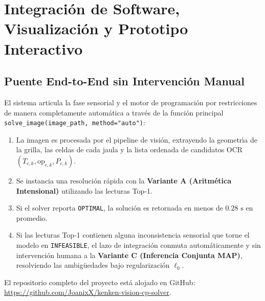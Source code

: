 
\section{Integraci\'on de Software, Visualizaci\'on y Prototipo Interactivo}
\label{sec:integration}

\subsection{Puente End-to-End sin Intervenci\'on Manual}
El sistema articula la fase sensorial y el motor de programaci\'on por restricciones de manera completamente autom\'atica a trav\'es de la funci\'on principal \texttt{solve\_image(image\_path, method="auto")}:

\begin{enumerate}
    \item La imagen es procesada por el pipeline de visi\'on, extrayendo la geometr\'{\i}a de la grilla, las celdas de cada jaula y la lista ordenada de candidatos OCR $(T_{c,k}, \text{op}_{c,k}, P_{c,k})$.
    \item Se instancia una resoluci\'on r\'apida con la \textbf{Variante A (Aritm\'etica Intensional)} utilizando las lecturas Top-1.
    \item Si el solver reporta \texttt{OPTIMAL}, la soluci\'on es retornada en menos de $0.28\text{ s}$ en promedio.
    \item Si las lecturas Top-1 contienen alguna inconsistencia sensorial que torne el modelo en \texttt{INFEASIBLE}, el lazo de integraci\'on conmuta autom\'aticamente y sin intervenci\'on humana a la \textbf{Variante C (Inferencia Conjunta MAP)}, resolviendo las ambig\"uedades bajo regularizaci\'on $\ell_0$.
\end{enumerate}

El repositorio completo del proyecto est\'a alojado en GitHub: \url{https://github.com/JoanixX/kenken-vision-cp-solver}.

